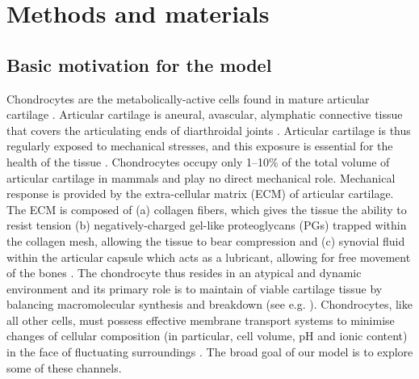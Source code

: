 \section{Methods and materials}
\label{sec:methods-and-materials}


\subsection{Basic motivation for the model}
\label{sec:model-motivation}

Chondrocytes are the metabolically-active cells found in mature
articular cartilage \citep{BarrettJolleyetal2010}. Articular cartilage
is aneural, avascular, alymphatic connective tissue that covers the
articulating ends of diarthroidal joints \citep{Poole1997,
Mankin1982}. Articular cartilage is thus regularly exposed to
mechanical stresses, and this exposure is essential for the health of
the tissue \citep{Stockwell1991}. Chondrocytes occupy only 1--10\% of
the total volume of articular cartilage in mammals
\citep{CarneyMuir1988, Halletal1996} and play no direct mechanical
role. Mechanical response is provided by the extra-cellular matrix
(ECM) of articular cartilage. The ECM is composed of (a) collagen
fibers, which gives the tissue the ability to resist tension (b)
negatively-charged gel-like proteoglycans (PGs) trapped within the
collagen mesh, allowing the tissue to bear compression
\citep{Poole1997, BuckwaterMankin1998} and (c) synovial fluid within
the articular capsule which acts as a lubricant, allowing for free
movement of the bones \citep{Edwards1994}. The chondrocyte thus
resides in an atypical and dynamic environment and its primary role is
to maintain of viable cartilage tissue by balancing macromolecular
synthesis and breakdown (see e.g. \citet{Wilkinsetal2000,
Stockwell1991, Fassbender1987}). Chondrocytes, like all other cells,
must possess effective membrane transport systems to minimise changes
of cellular composition (in particular, cell volume, pH and ionic
content) in the face of fluctuating surroundings \citep{Halletal1996,
  Mobasherietal1998, Stein1990}. The broad goal of our model is to
explore some of these channels.

